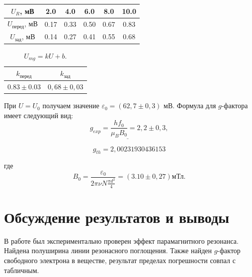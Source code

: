 \documentclass[a4paper,12pt]{article} %
\begin{document}
        \begin{center}
        \begin{tabular}{|c|c|c|c|c|c|}
            \hline
            $U_R$, мВ              & 2.0 & 4.0 & 6.0 & 8.0 & 10.0 \\ \hline
            $U_{\text{перед}}$, мВ & 0.17 & 0.33 & 0.50 & 0.67 & 0.83  \\ \hline
            $U_{\text{зад}}$, мВ   & 0.14 & 0.27 & 0.41 & 0.55 & 0.68  \\ \hline
            \end{tabular}
        \end{center}


		\floatsetup[table]{}	
		\begin{table}[H]
			\caption{$U_{mg} = kU + b$.}
			\label{tab:P}
			\begin{tabular}{|c|c|}
				\hline
				$k_{\text{перед}}$ & $k_{\text{зад}}$ \\ \hline
				$0.83 \pm 0.03 $   & $0,68 \pm 0,03$       \\ \hline
			\end{tabular}
		\end{table}
		
		При $U=U_0$ получаем значение $\varepsilon_0 = (62,7 \pm 0,3)$ мВ. Формула для $g$-фактора имеет следующий вид:
		\begin{equation*}
			\underline{g_{exp} = \frac{hf_0}{\mu_BB_0} = 2,2 \pm 0,3},
        \end{equation*}

        \begin{equation*}
            g_{th} = 2,00231930436153
        \end{equation*}

		где
		\begin{equation*}
			B_0 = \frac{\varepsilon_0}{2\pi\nu N \frac{\pi d^2}{4}} = (3.10 \pm 0,27) \text{мТл}.
		\end{equation*}
		

\newpage
\section{Обсуждение результатов и выводы}
	В работе был экспериментально проверен эффект парамагнитного резонанса. Найдена полуширина линии резонасного поглощения. Также найден $g$-фактор свободного электрона в веществе, результат пределах погрешности совпал с табличным.
	
\end{document}
